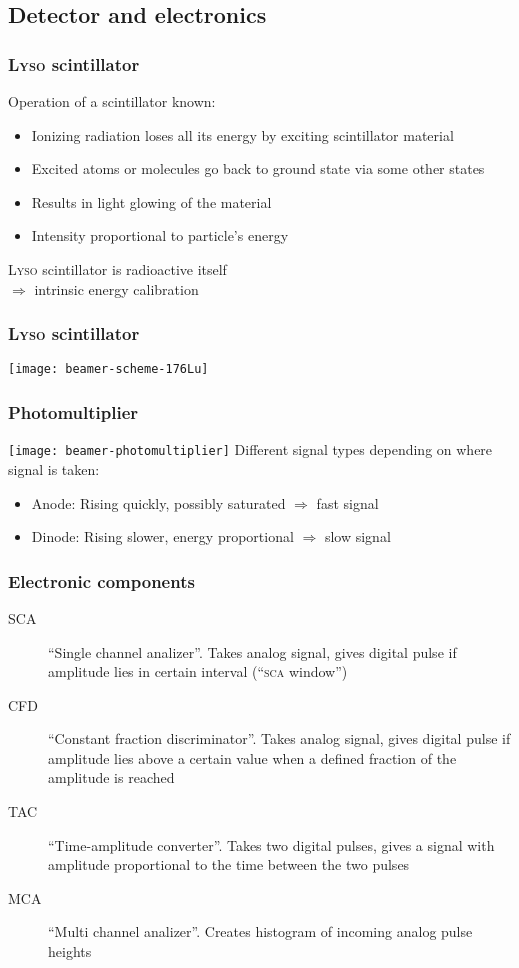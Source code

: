 \documentclass[english, fleqn]{beamer}
\begin{document}
\subsection{Detector and electronics}

\begin{frame}
    \frametitle{\textsc{Lyso} scintillator}
    Operation of a scintillator known:
    \begin{itemize}
        \item 
            Ionizing radiation loses all its energy by exciting scintillator material
        \item
            Excited atoms or molecules go back to ground state via some other states
        \item
            Results in light glowing of the material
        \item
            Intensity proportional to particle's energy
    \end{itemize}
    \pause
    \textsc{Lyso} scintillator is radioactive itself\\
    $\Rightarrow$ intrinsic energy calibration
\end{frame}

\begin{frame}
    \frametitle{\textsc{Lyso} scintillator}
    \centering
    \texttt{[image: beamer-scheme-176Lu]}
\end{frame}

\begin{frame}
    \frametitle{Photomultiplier}
    \texttt{[image: beamer-photomultiplier]}
    \pause
    Different signal types depending on where signal is taken:
    \begin{itemize}
        \item 
            Anode: Rising quickly, possibly saturated $\Rightarrow$ fast signal
        \item
            Dinode: Rising slower, energy proportional $\Rightarrow$ slow signal
    \end{itemize}
\end{frame}

\begin{frame}
    \frametitle{Electronic components}
    \begin{description}
    \item[SCA]
        “Single channel analizer”. Takes analog signal, gives digital pulse if amplitude lies in certain interval (“\textsc{sca} window”)
    \item[CFD]
        “Constant fraction discriminator”. Takes analog signal, gives digital pulse if amplitude lies above a certain value when a defined fraction of the amplitude is reached
    \item[TAC]
        “Time-amplitude converter”. Takes two digital pulses, gives a signal with amplitude proportional to the time between the two pulses
    \item[MCA]
        “Multi channel analizer”. Creates histogram of incoming analog pulse heights
    \end{description}
\end{frame}
\end{document}

